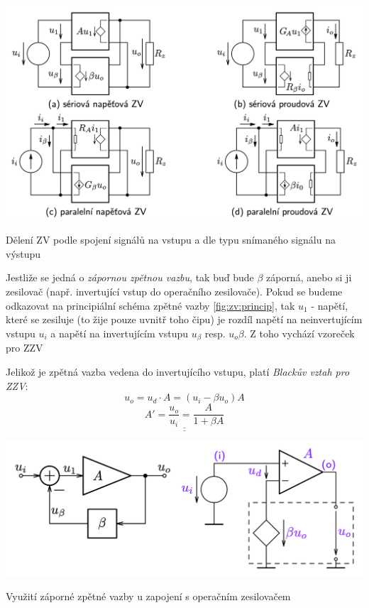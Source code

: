 \documentclass[a4paper,12pt]{article}   %
\begin{document}
\begin{schema}[h!]
    \centering
    \includegraphics[width=.8\textwidth]{ZV-obvody.png}
    \caption{Dělení ZV podle spojení signálů na vstupu a dle typu snímaného signálu na výstupu}
    \label{fig:ZV:deleni}
\end{schema}


Jestliže se jedná o \textit{zápornou zpětnou vazbu}, tak buď bude $\beta$ záporná, anebo si ji  zesilovač (např. invertující vstup do operačního zesilovače). Pokud se budeme odkazovat na principiální schéma zpětné vazby \ref{fig:zv:princip}, tak $u_1$ - napětí, které se zesiluje (to žije pouze uvnitř toho čipu) je rozdíl napětí na neinvertujícím vstupu $u_i$ a napětí na invertujícím vstupu $u_\beta$ resp. $u_o\beta$. Z toho vychází vzoreček pro ZZV

Jelikož je zpětná vazba vedena do invertujícího vstupu, platí \textit{Blackův vztah pro ZZV}:
\begin{equation*}
    u_o = u_d\cdot A = (u_i -\beta u_o) A
\end{equation*}
\begin{equation}
    \underline{\underline{A' = \frac{u_o}{u_i} = \frac{A}{1+\beta A}}}
    \label{eq:vysledne:zesileni}
\end{equation}

\begin{schema}[h!]
    \centering
    \includegraphics[width=.7\textwidth]{ZZV-OZ.png}
    \caption{Využití záporné zpětné vazby u zapojení s operačním zesilovačem}
    \label{fig:opamp:ZZV}
\end{schema}
\end{document}
